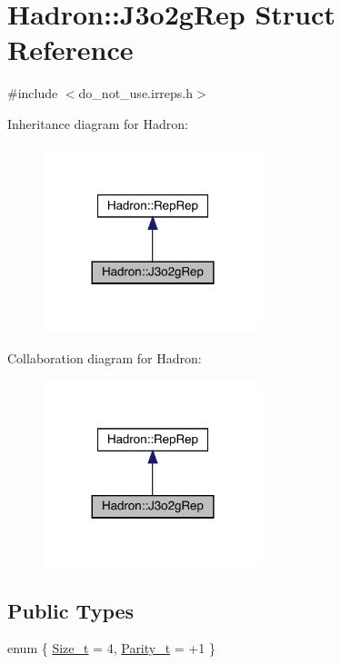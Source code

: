 \hypertarget{structHadron_1_1J3o2gRep}{}\section{Hadron\+:\+:J3o2g\+Rep Struct Reference}
\label{structHadron_1_1J3o2gRep}


{\ttfamily \#include $<$do\+\_\+not\+\_\+use.\+irreps.\+h$>$}



Inheritance diagram for Hadron\+:\nopagebreak
\begin{figure}[H]
\begin{center}
\leavevmode
\includegraphics[width=180pt]{dd/d2c/structHadron_1_1J3o2gRep__inherit__graph}
\end{center}
\end{figure}


Collaboration diagram for Hadron\+:\nopagebreak
\begin{figure}[H]
\begin{center}
\leavevmode
\includegraphics[width=180pt]{d1/da7/structHadron_1_1J3o2gRep__coll__graph}
\end{center}
\end{figure}
\subsection*{Public Types}
\begin{DoxyCompactItemize}
\item 
enum \{ \mbox{\hyperlink{structHadron_1_1J3o2gRep_a5745b15de1987fde8642b29ca09e8551a486bed65f54109a6eb7c009ab6f2acb1}{Size\+\_\+t}} = 4, 
\mbox{\hyperlink{structHadron_1_1J3o2gRep_a5745b15de1987fde8642b29ca09e8551a9c4d3784274c2872212d308e202af99c}{Parity\+\_\+t}} = +1
 \}
\end{DoxyCompactItemize}
